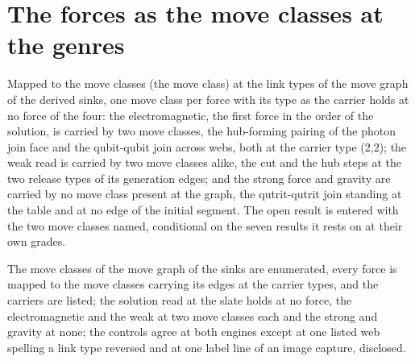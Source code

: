 \section{The forces as the move classes at the genres}\label{mod:I-4-D538891-w-fmcg}
\begin{chwall}\label{box:I-4-D538891-w-fmcg:1}
Mapped to the move classes (the move class) at the link types of the move graph of the derived sinks, one move class per force with its type as the carrier holds at no force of the four: the electromagnetic, the first force in the order of the solution, is carried by two move classes, the hub-forming pairing of the photon join face and the qubit-qubit join across webs, both at the carrier type (2,2); the weak read is carried by two move classes alike, the cut and the hub steps at the two release types of its generation edges; and the strong force and gravity are carried by no move class present at the graph, the qutrit-qutrit join standing at the table and at no edge of the initial segment. The open result is entered with the two move classes named, conditional on the seven results it rests on at their own grades.
\end{chwall}
The move classes of the move graph of the sinks are enumerated, every force is mapped to the move classes carrying its edges at the carrier types, and the carriers are listed; the solution read at the slate holds at no force, the electromagnetic and the weak at two move classes each and the strong and gravity at none; the controls agree at both engines except at one listed web spelling a link type reversed and at one label line of an image capture, disclosed.

